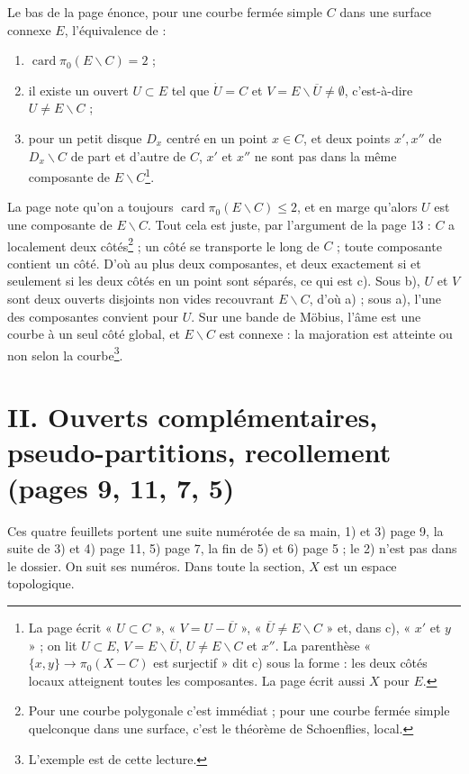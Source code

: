 \documentclass[11pt,a4paper]{article}
\begin{document}
Le bas de la page énonce, pour une courbe fermée simple $C$ dans une surface
connexe $E$, l'équivalence de :
\begin{enumerate}
  \item[a)] $\operatorname{card} \pi_0(E \smallsetminus C) = 2$ ;
  \item[b)] il existe un ouvert $U \subset E$ tel que $\dot{U} = C$ et $V = E
    \smallsetminus \overline{U} \neq \emptyset$, c'est-à-dire $U \neq E
    \smallsetminus C$ ;
  \item[c)] pour un petit disque $D_x$ centré en un point $x \in C$, et deux
    points $x', x''$ de $D_x \smallsetminus C$ de part et d'autre de $C$,
    $x'$ et $x''$ ne sont pas dans la même composante de $E \smallsetminus
    C$\footnote{La page écrit « $U \subset C$ », « $V = U - \overline{U}$ »,
    « $\overline{U} \neq E \smallsetminus C$ » et, dans c), « $x'$ et $y$ » ;
    on lit $U \subset E$, $V = E \smallsetminus \overline{U}$, $U \neq E
    \smallsetminus C$ et $x''$. La parenthèse « $\{x, y\} \to \pi_0(X - C)$
    est surjectif » dit c) sous la forme : les deux côtés locaux atteignent
    toutes les composantes. La page écrit aussi $X$ pour $E$.}.
\end{enumerate}
La page note qu'on a toujours $\operatorname{card} \pi_0(E \smallsetminus C)
\leq 2$, et en marge qu'alors $U$ est une composante de $E \smallsetminus C$.
Tout cela est juste, par l'argument de la page 13 : $C$ a localement deux
côtés\footnote{Pour une courbe polygonale c'est immédiat ; pour une courbe
fermée simple quelconque dans une surface, c'est le théorème de Schoenflies,
local.} ; un côté se transporte le long de $C$ ; toute composante contient un
côté. D'où au plus deux composantes, et deux exactement si et seulement si les
deux côtés en un point sont séparés, ce qui est c). Sous b), $U$ et $V$ sont
deux ouverts disjoints non vides recouvrant $E \smallsetminus C$, d'où a) ;
sous a), l'une des composantes convient pour $U$. Sur une bande de Möbius,
l'âme est une courbe à un seul côté global, et $E \smallsetminus C$ est
connexe : la majoration est atteinte ou non selon la courbe\footnote{L'exemple
est de cette lecture.}.

\section*{II. Ouverts complémentaires, pseudo-partitions, recollement (pages 9, 11, 7, 5)}

Ces quatre feuillets portent une suite numérotée de sa main, 1) et 3) page 9,
la suite de 3) et 4) page 11, 5) page 7, la fin de 5) et 6) page 5 ; le 2)
n'est pas dans le dossier. On suit ses numéros. Dans toute la section, $X$ est
un espace topologique.
\end{document}

